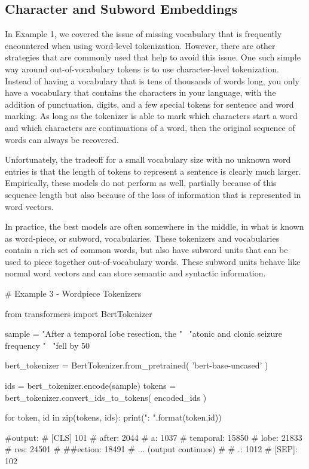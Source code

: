 \subsection{Character and Subword Embeddings}

In Example 1, we covered the issue of missing vocabulary that is frequently encountered when using word-level tokenization.
However, there are other strategies that are commonly used that help to avoid this issue.
One such simple way around out-of-vocabulary tokens is to use character-level tokenization.
Instead of having a vocabulary that is tens of thousands of words long, you only have a vocabulary that contains the characters in
your language, with the addition of punctuation, digits, and a few special tokens for sentence and word marking.
As long as the tokenizer is able to mark which characters start a word and which characters are continuations of a word, then the original sequence of words can always be recovered.

Unfortunately, the tradeoff for a small vocabulary size with no unknown word entries is that the length of tokens to represent a sentence is clearly much larger.
Empirically, these models do not perform as well, partially because of this sequence length but also because of the loss of information that is represented in word vectors.

In practice, the best models are often somewhere in the middle, in what is known as word-piece, or subword, vocabularies.
These tokenizers and vocabularies contain a rich set of common words, but also have subword units that can be used to piece together out-of-vocabulary words.
These subword units behave like normal word vectors and can store semantic and syntactic information.


\begin{python}
  # Example 3 - Wordpiece Tokenizers

  from transformers import BertTokenizer

  sample = "After a temporal lobe resection, the " \
           "atonic and clonic seizure frequency " \
           "fell by 50%

  bert_tokenizer = BertTokenizer.from_pretrained(
      'bert-base-uncased'
  )

  ids = bert_tokenizer.encode(sample)
  tokens = bert_tokenizer.convert_ids_to_tokens(
      encoded_ids
  )

  for token, id  in zip(tokens, ids):
      print("{}: {}".format(token,id))
  
  #output:
  # [CLS] 101
  # after: 2044
  # a: 1037
  # temporal: 15850
  # lobe: 21833
  # res: 24501
  # ##ection: 18491
  # ... (output continues)
  #   %
  # .: 1012
  # [SEP]: 102
\end{python}

